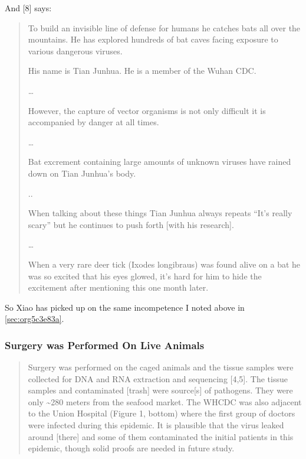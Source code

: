 \documentclass[11pt]{article}
\begin{document}
And [8] says:
\begin{quote}
To build an invisible line of defense for humans he catches bats all over the mountains. He has explored hundreds of bat caves facing exposure to various dangerous viruses.

His name is Tian Junhua. He is a member of the Wuhan CDC.

\ldots{}

However, the capture of vector organisms is not only difficult it is accompanied by danger at all times.

\ldots{}

Bat excrement containing large amounts of unknown viruses have rained down on Tian Junhua’s body.

..

When talking about these things Tian Junhua always repeats ``It’s really scary'' but he continues to push forth [with his research].

\ldots{}

When a very rare deer tick (Ixodes longibraus) was found alive on a bat he was so excited that his eyes glowed, it’s hard for him to hide the excitement after mentioning this one month later.
\end{quote}
So Xiao has picked up on the same incompetence I noted above in \ref{sec:org5c3e83a}.

\subsubsection{Surgery was Performed On Live Animals}
\label{sec:org8646bf4}
\begin{quote}
Surgery was performed on the caged animals and the tissue samples were collected for DNA and RNA extraction and sequencing [4,5]. The tissue samples and contaminated [trash] were source[s] of pathogens. They were only \textasciitilde{}280 meters from the seafood market. The WHCDC was also adjacent to the Union Hospital (Figure 1, bottom) where the first group of doctors were infected during this epidemic. It is plausible that the virus leaked around [there] and some of them contaminated the initial patients in this epidemic, though solid proofs are needed in future study.
\end{quote}
\end{document}
